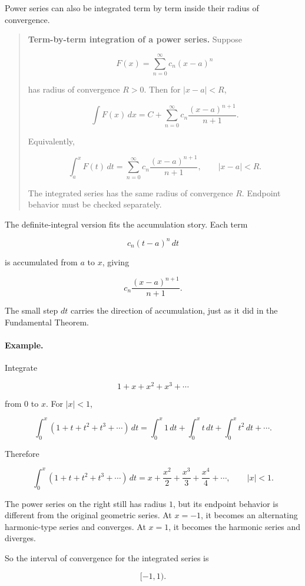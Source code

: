 Power series can also be integrated term by term inside their radius of convergence.

\begin{quote}
\textbf{Term-by-term integration of a power series.}
Suppose

\[
F(x)=\sum_{n=0}^{\infty} c_n(x-a)^n
\]

has radius of convergence \(R>0\).  Then for \(|x-a|<R\),

\[
\boxed{
\int F(x)\,dx
=
C+\sum_{n=0}^{\infty} c_n\frac{(x-a)^{n+1}}{n+1}.
}
\]

Equivalently,

\[
\boxed{
\int_a^x F(t)\,dt
=
\sum_{n=0}^{\infty} c_n\frac{(x-a)^{n+1}}{n+1},
\qquad |x-a|<R.
}
\]

The integrated series has the same radius of convergence \(R\).  Endpoint behavior
must be checked separately.
\end{quote}

The definite-integral version fits the accumulation story.  Each term

\[
c_n(t-a)^n\,dt
\]

is accumulated from \(a\) to \(x\), giving

\[
c_n\frac{(x-a)^{n+1}}{n+1}.
\]

The small step \(dt\) carries the direction of accumulation, just as it did in the
Fundamental Theorem.

\paragraph{Example.}
Integrate

\[
1+x+x^2+x^3+\cdots
\]

from \(0\) to \(x\).  For \(|x|<1\),

\[
\int_0^x (1+t+t^2+t^3+\cdots)\,dt
=
\int_0^x 1\,dt+\int_0^x t\,dt+\int_0^x t^2\,dt+\cdots.
\]

Therefore

\[
\boxed{
\int_0^x (1+t+t^2+t^3+\cdots)\,dt
=
x+\frac{x^2}{2}+\frac{x^3}{3}+\frac{x^4}{4}+\cdots,
\qquad |x|<1.
}
\]

The power series on the right still has radius \(1\), but its endpoint behavior is different
from the original geometric series.  At \(x=-1\), it becomes an alternating harmonic-type
series and converges.  At \(x=1\), it becomes the harmonic series and diverges.

So the interval of convergence for the integrated series is

\[
[-1,1).
\]

